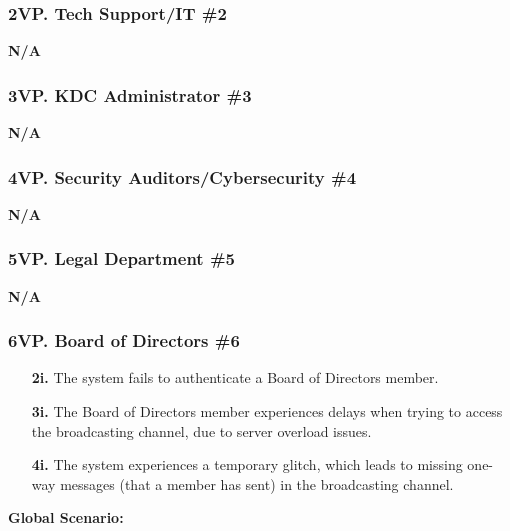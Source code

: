 \documentclass[]{article}
\begin{document}
\subsubsection*{2VP. Tech Support/IT \#2}
\textbf{N/A}
\subsubsection*{3VP. KDC Administrator \#3}
\textbf{N/A}
\subsubsection*{4VP. Security Auditors/Cybersecurity \#4}
\textbf{N/A}
\subsubsection*{5VP. Legal Department \#5}
\textbf{N/A}
\subsubsection*{6VP. Board of Directors \#6}
\begin{enumerate}
	\item[\textbf{2i.}] The system fails to authenticate a Board of Directors member.
	\item[\textbf{3i.}] The Board of Directors member experiences delays when trying to access the broadcasting channel, due to server overload issues.
	\item[\textbf{4i.}] The system experiences a temporary glitch, which leads to missing one-way messages (that a member has sent) in the broadcasting channel.
\end{enumerate}
\textbf{Global Scenario:}
\end{document}
